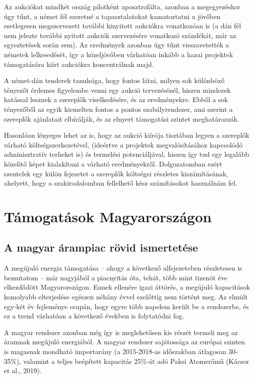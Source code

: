 \documentclass[twoside, magyar, showtrims]{corvinusphd}
\theoremstyle{plain}
\theoremstyle{remark}
\theoremstyle{definition}
\begin{document}
Az aukciókat mindkét ország pilotként aposztrofálta, azonban a megegyezéskor
úgy tűnt, a német fél szeretné a tapasztalatokat kamatoztatni a jövőben
esetlegesen megszervezett további kinyitott aukciókra vonatkozóan is
(a dán fél nem jelezte további nyitott aukciók szervezésére vonatkozó szándékát,
már az egyeztetések során sem). Az eredmények azonban úgy tűnt visszavetették
a németek lelkesedését, így a közeljövőben várhatóan inkább a hazai projektek
támogatására kiírt aukciókra koncentrálnak majd.

A német-dán tenderek tanulsága, hogy fontos látni,
milyen sok különböző tényezőt érdemes figyelembe
venni egy aukció tervezésénél, hiszen mindezek hatással lesznek a szereplők
viselkedésére, és az eredményekre. Ebből a sok tényezőből az egyik kiemelten fontos
a pontos szabályrendszer, ami szerint a szereplők ajánlatait elbírálják, és 
az elnyert támogatási szintet meghatározzák.

Hasonlóan lényeges lehet az is, hogy az aukció kiírója
tisztában legyen a szereplők várható költségszerkezetével,
(ideértve a projektek megvalósításához kapcsolódó adminisztratív terheket is)
és termelési potenciáljával, hiszen így tud egy legalább közelítő képet kialakítani
a várható eredményekről. Dolgozatomban ezért szentelek egy külön
fejezetet a szereplők költségei részletes kiszámításának, ahelyett, hogy
a szakirodalomban fellelhető kész számításokat használnám fel.

\section{Támogatások Magyarországon}

\subsection{A magyar árampiac rövid ismertetése}

A megújuló energia támogatása -- ahogy a következő
alfejezeteben részletesen is bemutatom -- már nagyjából a piacnyitás óta,
tehát, több mint tizenöt éve elkezdődött Magyarországon.
Ennek ellenére igazi áttörés, a megújuló kapacitások
komolyabb elterjedése egészen néhány évvel ezelőttig 
nem történt meg. Az elmúlt egy-két év fejleménye
csupán, hogy egyre több napelem került be a rendszerbe,
és ez a trend várhatóan a következő években is folytatódni fog.

A magyar rendszer azonban még így is meglehetősen
kis részét termeli meg az áramnak megújuló energiából.
A magyar rendszer sajátossága az európai szinten is
magasnak mondható importarány (a 2015-2018-as
időszakban átlagosan 30-35\%), 
valamint a teljes beépített kapacitás 25\%-át adó
Paksi Atomerőmű (Kácsor et al., 2019).
\end{document}

